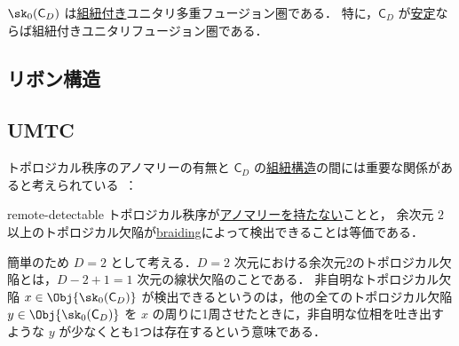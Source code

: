 \documentclass[TQFT_main]{subfiles}
\begin{document}
\begin{mypropph}[label=prop:sk0-braided]{}
    $\sk_0(\mathsf{C}_D)$ は\hyperref[def:braided-monoidal]{組紐付き}ユニタリ多重フュージョン圏である．
    特に，$\mathsf{C}_D$ が\hyperref[def:stableTO]{安定}ならば組紐付きユニタリフュージョン圏である．
\end{mypropph}


\subsection{リボン構造}



\subsection{UMTC}

トポロジカル秩序のアノマリーの有無と $\mathsf{C}_D$ の\hyperref[redef:braided-monoidal]{組紐構造}の間には重要な関係があると考えられている~\cite{KongWen2014braidedfusioncategoriesgravitational}：

\begin{myconjph}[label=conj:remote-detectable]{remote-detectable}
    トポロジカル秩序が\hyperref[def:anomalousQP]{アノマリーを持たない}ことと，
    余次元 $2$ 以上のトポロジカル欠陥が\hyperref[redef:braided-monoidal]{braiding}によって検出できることは等価である．
\end{myconjph}

簡単のため $D=2$ として考える．$D=2$ 次元における余次元2のトポロジカル欠陥とは，$D-2+1 = 1$ 次元の線状欠陥のことである．
非自明なトポロジカル欠陥 $x \in \Obj{\sk_0(\mathsf{C}_D)}$ が検出できるというのは，他の全てのトポロジカル欠陥 $y \in \Obj{\sk_0(\mathsf{C}_D)}$ を $x$ の周りに1周させたときに，非自明な位相を吐き出すような $y$ が少なくとも1つは存在するという意味である．
\end{document}
